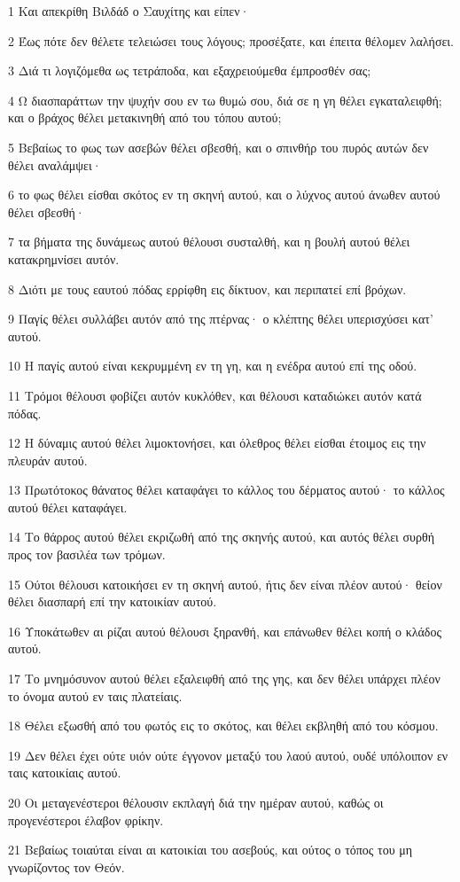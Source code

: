 \par 1 Και απεκρίθη Βιλδάδ ο Σαυχίτης και είπεν·
\par 2 Έως πότε δεν θέλετε τελειώσει τους λόγους; προσέξατε, και έπειτα θέλομεν λαλήσει.
\par 3 Διά τι λογιζόμεθα ως τετράποδα, και εξαχρειούμεθα έμπροσθέν σας;
\par 4 Ω διασπαράττων την ψυχήν σου εν τω θυμώ σου, διά σε η γη θέλει εγκαταλειφθή; και ο βράχος θέλει μετακινηθή από του τόπου αυτού;
\par 5 Βεβαίως το φως των ασεβών θέλει σβεσθή, και ο σπινθήρ του πυρός αυτών δεν θέλει αναλάμψει·
\par 6 το φως θέλει είσθαι σκότος εν τη σκηνή αυτού, και ο λύχνος αυτού άνωθεν αυτού θέλει σβεσθή·
\par 7 τα βήματα της δυνάμεως αυτού θέλουσι συσταλθή, και η βουλή αυτού θέλει κατακρημνίσει αυτόν.
\par 8 Διότι με τους εαυτού πόδας ερρίφθη εις δίκτυον, και περιπατεί επί βρόχων.
\par 9 Παγίς θέλει συλλάβει αυτόν από της πτέρνας· ο κλέπτης θέλει υπερισχύσει κατ' αυτού.
\par 10 Η παγίς αυτού είναι κεκρυμμένη εν τη γη, και η ενέδρα αυτού επί της οδού.
\par 11 Τρόμοι θέλουσι φοβίζει αυτόν κυκλόθεν, και θέλουσι καταδιώκει αυτόν κατά πόδας.
\par 12 Η δύναμις αυτού θέλει λιμοκτονήσει, και όλεθρος θέλει είσθαι έτοιμος εις την πλευράν αυτού.
\par 13 Πρωτότοκος θάνατος θέλει καταφάγει το κάλλος του δέρματος αυτού· το κάλλος αυτού θέλει καταφάγει.
\par 14 Το θάρρος αυτού θέλει εκριζωθή από της σκηνής αυτού, και αυτός θέλει συρθή προς τον βασιλέα των τρόμων.
\par 15 Ούτοι θέλουσι κατοικήσει εν τη σκηνή αυτού, ήτις δεν είναι πλέον αυτού· θείον θέλει διασπαρή επί την κατοικίαν αυτού.
\par 16 Υποκάτωθεν αι ρίζαι αυτού θέλουσι ξηρανθή, και επάνωθεν θέλει κοπή ο κλάδος αυτού.
\par 17 Το μνημόσυνον αυτού θέλει εξαλειφθή από της γης, και δεν θέλει υπάρχει πλέον το όνομα αυτού εν ταις πλατείαις.
\par 18 Θέλει εξωσθή από του φωτός εις το σκότος, και θέλει εκβληθή από του κόσμου.
\par 19 Δεν θέλει έχει ούτε υιόν ούτε έγγονον μεταξύ του λαού αυτού, ουδέ υπόλοιπον εν ταις κατοικίαις αυτού.
\par 20 Οι μεταγενέστεροι θέλουσιν εκπλαγή διά την ημέραν αυτού, καθώς οι προγενέστεροι έλαβον φρίκην.
\par 21 Βεβαίως τοιαύται είναι αι κατοικίαι του ασεβούς, και ούτος ο τόπος του μη γνωρίζοντος τον Θεόν.

